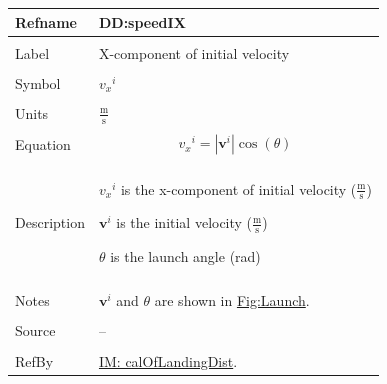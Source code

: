 \documentclass[12pt]{article}
\begin{document}
\noindent \begin{minipage}{\textwidth}
\begin{tabular}{p{} p{}}
\toprule \textbf{Refname} & \textbf{DD:speedIX}
\label{DD:speedIX}
\\ \midrule \\
Label & X-component of initial velocity
\\ \midrule \\
Symbol & ${{v_{x}}^{i}}$
\\ \midrule \\
Units & $\frac{\text{m}}{\text{s}}$
\\ \midrule \\
Equation & \begin{displaymath}
           {{v_{x}}^{i}}=|{\mathbf{v}^{i}}| \cos\left(θ\right)
           \end{displaymath}
\\ \midrule \\
Description & \begin{symbDescription}
              \item{${{v_{x}}^{i}}$ is the x-component of initial velocity ($\frac{\text{m}}{\text{s}}$)}
              \item{${\mathbf{v}^{i}}$ is the initial velocity ($\frac{\text{m}}{\text{s}}$)}
              \item{$θ$ is the launch angle (rad)}
              \end{symbDescription}
\\ \midrule \\
Notes & ${\mathbf{v}^{i}}$ and $θ$ are shown in \hyperref[Figure:Launch]{Fig:Launch}.
\\ \midrule \\
Source & --
\\ \midrule \\
RefBy & \hyperref[IM:calOfLandingDist]{IM: calOfLandingDist}.
\\ \bottomrule \end{tabular}
\end{minipage}
\par~
\end{document}
